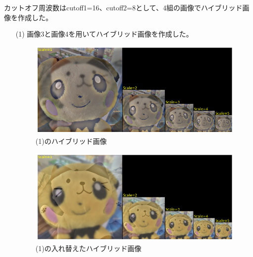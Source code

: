 \documentclass[12pt]{jarticle}
\begin{document}
\subsubsection{}
カットオフ周波数はcutoff1=16、cutoff2=8として、4組の画像でハイブリッド画像を作成した。

\begin{itemize}
    \item [(1)]画像3と画像4を用いてハイブリッド画像を作成した。
          \begin{figure}[h]
              \begin{center}
                  \includegraphics[scale=0.7]{kadai4_3_17.png}
              \end{center}
              \caption{(1)のハイブリッド画像}
          \end{figure}

          \clearpage
          \begin{figure}[h]
              \begin{center}
                  \includegraphics[scale=0.7]{kadai4_3_18.png}
              \end{center}
              \caption{(1)の入れ替えたハイブリッド画像}
          \end{figure}


\end{itemize}
\end{document}
